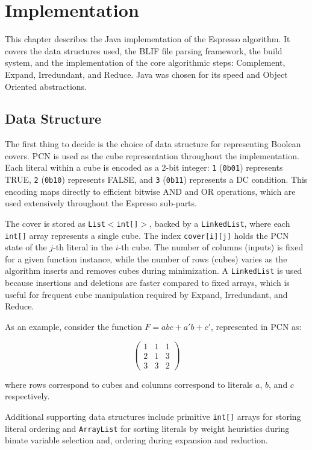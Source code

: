\chapter{Implementation}

This chapter describes the Java implementation of the Espresso algorithm. It covers the data structures used, the BLIF file parsing framework, the build system, and the implementation of the core algorithmic steps: Complement, Expand, Irredundant, and Reduce. Java was chosen for its speed and Object Oriented abstractions.

\section{Data Structure}
\label{sec:datastructure}

The first thing to decide is the choice of data structure for representing Boolean covers. \ac{PCN} is used as the cube representation throughout the implementation. Each literal within a cube is encoded as a 2-bit integer: \texttt{1} (\texttt{0b01}) represents TRUE, \texttt{2} (\texttt{0b10}) represents FALSE, and \texttt{3} (\texttt{0b11}) represents a \ac{DC} condition. This encoding maps directly to efficient bitwise AND and OR operations, which are used extensively throughout the Espresso sub-parts.

The cover is stored as \texttt{List$<$int[]$>$}, backed by a \texttt{LinkedList}, where each \texttt{int[]} array represents a single cube. The index \texttt{cover[i][j]} holds the PCN state of the $j$-th literal in the $i$-th cube. The number of columns (inputs) is fixed for a given function instance, while the number of rows (cubes) varies as the algorithm inserts and removes cubes during minimization. A \texttt{LinkedList} is used because insertions and deletions are faster compared to fixed arrays, which is useful for frequent cube manipulation required by Expand, Irredundant, and Reduce.

As an example, consider the function $F = abc + a'b + c'$, represented in PCN as:

\[
\begin{pmatrix}
1 & 1 & 1 \\
2 & 1 & 3 \\
3 & 3 & 2
\end{pmatrix}
\]

where rows correspond to cubes and columns correspond to literals $a$, $b$, and $c$ respectively.

Additional supporting data structures include primitive \texttt{int[]} arrays for storing literal ordering and \texttt{ArrayList} for sorting literals by weight heuristics during binate variable selection and, ordering during expansion and reduction.

